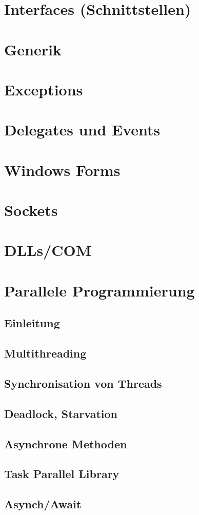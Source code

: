 \documentclass{scrreprt}
\begin{document}
\chapter{Interfaces (Schnittstellen)}


\chapter{Generik}


\chapter{Exceptions}


\chapter{Delegates und Events}


\chapter{Windows Forms}



\chapter{Sockets}


\chapter{DLLs/COM}


\chapter{Parallele Programmierung}
\section{Einleitung}

\section{Multithreading}

\section{Synchronisation von Threads}

\section{Deadlock, Starvation}

\section{Asynchrone Methoden}

\section{Task Parallel Library}

\section{Asynch/Await}

\end{document}
